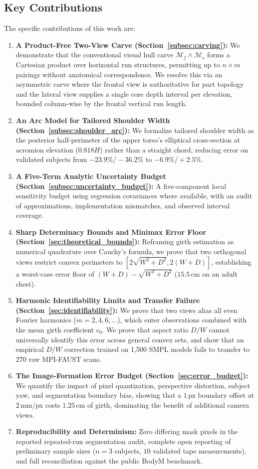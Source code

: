 \documentclass[journal]{IEEEtran}
\begin{document}
\subsection{Key Contributions}
The specific contributions of this work are:
\begin{enumerate}
    \item \textbf{A Product-Free Two-View Carve (Section~\ref{subsec:carving}):} We demonstrate that the conventional visual hull carve $\mathcal{M}_f \wedge \mathcal{M}_s$ forms a Cartesian product over horizontal run structures, permitting up to $n \times m$ pairings without anatomical correspondence. We resolve this via an asymmetric carve where the frontal view is authoritative for part topology and the lateral view supplies a single core depth interval per elevation, bounded column-wise by the frontal vertical run length.
    \item \textbf{An Arc Model for Tailored Shoulder Width (Section~\ref{subsec:shoulder_arc}):} We formalize tailored shoulder width as the posterior half-perimeter of the upper torso's elliptical cross-section at acromion elevation ($0.818H$) rather than a straight chord, reducing error on validated subjects from $-23.9\%/-36.2\%$ to $-6.9\%/+2.5\%$.
    \item \textbf{A Five-Term Analytic Uncertainty Budget (Section~\ref{subsec:uncertainty_budget}):} A five-component local sensitivity budget using regression covariances where available, with an audit of approximations, implementation mismatches, and observed interval coverage.
    \item \textbf{Sharp Determinacy Bounds and Minimax Error Floor (Section~\ref{sec:theoretical_bounds}):} Reframing girth estimation as numerical quadrature over Cauchy's formula, we prove that two orthogonal views restrict convex perimeters to $[2\sqrt{W^2+D^2}, 2(W+D)]$, establishing a worst-case error floor of $(W+D)-\sqrt{W^2+D^2}$ ($15.5$\,cm on an adult chest).
    \item \textbf{Harmonic Identifiability Limits and Transfer Failure (Section~\ref{sec:identifiability}):} We prove that two views alias all even Fourier harmonics ($m=2,4,6,\dots$), which enter observations combined with the mean girth coefficient $c_0$. We prove that aspect ratio $D/W$ cannot universally identify this error across general convex sets, and show that an empirical $D/W$ correction trained on 1,500 SMPL models fails to transfer to 270 raw MPI-FAUST scans.
    \item \textbf{The Image-Formation Error Budget (Section~\ref{sec:error_budget}):} We quantify the impact of pixel quantization, perspective distortion, subject yaw, and segmentation boundary bias, showing that a $1$\,px boundary offset at $2$\,mm/px costs $1.25$\,cm of girth, dominating the benefit of additional camera views.
    \item \textbf{Reproducibility and Determinism:} Zero differing mask pixels in the reported repeated-run segmentation audit, complete open reporting of preliminary sample sizes ($n=3$ subjects, $10$ validated tape measurements), and full reconciliation against the public BodyM benchmark.
\end{enumerate}
\end{document}
